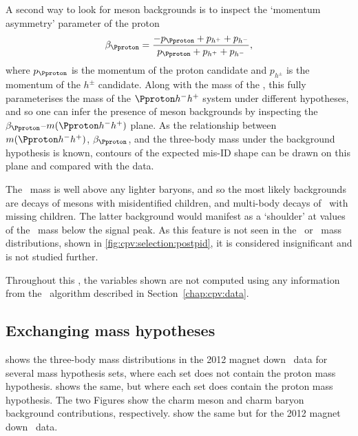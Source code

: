 A second way to look for meson backgrounds is to inspect the `momentum 
asymmetry' parameter of the proton
\begin{equation}
  \beta_{\Pproton} = \frac{-p_{\Pproton} + p_{\Php} + p_{\Phm}}{p_{\Pproton} + p_{\Php} + p_{\Phm}},
  \label{eqn:cpv:selection:background_study:mom_asym}
\end{equation}
where $p_{\Pproton}$ is the momentum of the proton candidate and $p_{h^{\pm}}$ 
is the momentum of the $h^{\pm}$ candidate.
Along with the mass of the \PLambdac, this fully parameterises the mass of the 
$\phh$ system under different hypotheses, and so one can infer the presence of 
meson backgrounds by inspecting the $\beta_{\Pproton}$--$m(\phh)$ plane.
As the relationship between $m(\phh)$, $\beta_{\Pproton}$, and the three-body 
mass under the background hypothesis is known, contours of the expected mis-ID 
shape can be drawn on this plane and compared with the data.

The \PLambdac\ mass is well above any lighter baryons, and so the most likely 
backgrounds are decays of \PD mesons with misidentified children, and 
multi-body decays of \PLambdac\ with missing children.
The latter background would manifest as a `shoulder' at values of the 
\PLambdac\ mass below the signal peak.
As this feature is not seen in the \pKK\ or \ppipi\ mass distributions, shown 
in \cref{fig:cpv:selection:postpid}, it is considered insignificant and is not 
studied further.

Throughout this , the variables 
shown are not computed using any information from the \decaytreefitter\ 
algorithm described in Section~\ref{chap:cpv:data}.

\subsection{Exchanging mass hypotheses}
\label{chap:cpv:selection:background_study:mass_hypo}

 shows the three-body mass 
distributions in the 2012 magnet down \pKK\ data for several mass hypothesis 
sets, where each set does not contain the proton mass hypothesis.
\Cref{fig:selection:background_study:pKK_baryon} shows the same, but where each 
set does contain the proton mass hypothesis.
The two Figures show the charm meson and charm baryon background contributions, 
respectively.
show the same but for the 2012 magnet down \ppipi\ data.

